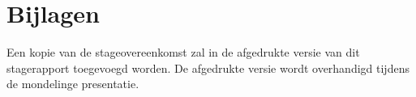 \documentclass[a4paper,11pt]{article}
\theoremstyle{definition}
\begin{document}
\section{Bijlagen}
Een kopie van de stageovereenkomst zal in de afgedrukte versie van dit 
stagerapport toegevoegd worden. De afgedrukte versie wordt overhandigd tijdens 
de mondelinge presentatie.


 
\end{document}
